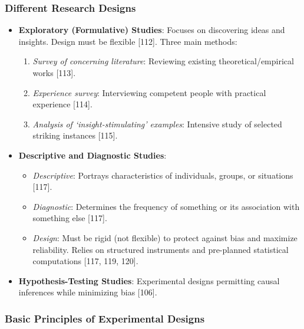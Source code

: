 \documentclass[
]{article}
\providecommand{\tightlist}{%
  \setlength{\itemsep}{0pt}\setlength{\parskip}{0pt}}
\begin{document}
\subsubsection{Different Research
Designs}\label{different-research-designs}

\begin{itemize}
\tightlist
\item
  \textbf{Exploratory (Formulative) Studies}: Focuses on discovering
  ideas and insights. Design must be flexible {[}112{]}. Three main
  methods:

  \begin{enumerate}
  \def\labelenumi{\arabic{enumi}.}
  \tightlist
  \item
    \emph{Survey of concerning literature}: Reviewing existing
    theoretical/empirical works {[}113{]}.
  \item
    \emph{Experience survey}: Interviewing competent people with
    practical experience {[}114{]}.
  \item
    \emph{Analysis of `insight-stimulating' examples}: Intensive study
    of selected striking instances {[}115{]}.
  \end{enumerate}
\item
  \textbf{Descriptive and Diagnostic Studies}:

  \begin{itemize}
  \tightlist
  \item
    \emph{Descriptive}: Portrays characteristics of individuals, groups,
    or situations {[}117{]}.
  \item
    \emph{Diagnostic}: Determines the frequency of something or its
    association with something else {[}117{]}.
  \item
    \emph{Design}: Must be rigid (not flexible) to protect against bias
    and maximize reliability. Relies on structured instruments and
    pre-planned statistical computations {[}117, 119, 120{]}.
  \end{itemize}
\item
  \textbf{Hypothesis-Testing Studies}: Experimental designs permitting
  causal inferences while minimizing bias {[}106{]}.
\end{itemize}

\subsubsection{Basic Principles of Experimental
Designs}\label{basic-principles-of-experimental-designs}
\end{document}
